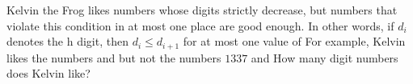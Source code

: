Kelvin the Frog likes numbers whose digits strictly decrease, but numbers that violate this condition in at most one place are good enough. In other words, if $d_i$ denotes the h digit, then $d_i\le d_{i+1}$ for at most one value of  For example, Kelvin likes the numbers   and  but not the numbers $1337$ and  How many digit numbers does Kelvin like?